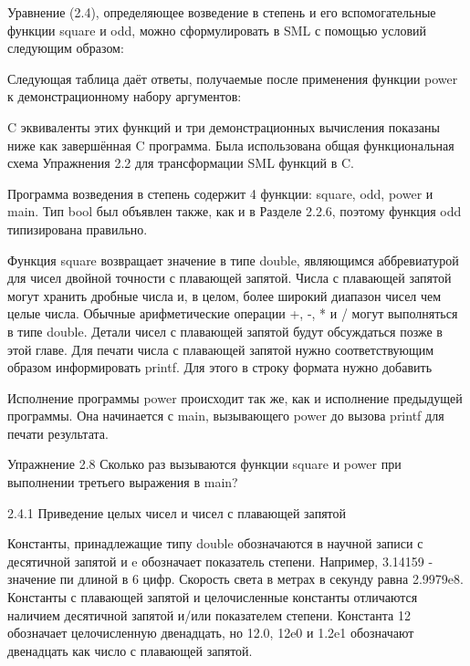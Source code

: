 Уравнение (2.4), определяющее возведение в степень и его вспомогательные функции square и odd, можно сформулировать в SML с помощью условий следующим образом:

Следующая таблица даёт ответы, получаемые после применения функции power к демонстрационному набору аргументов:

C эквиваленты этих функций и три демонстрационных вычисления показаны ниже как завершённая C программа. Была использована общая функциональная схема Упражнения 2.2 для трансформации SML функций в C.

Программа возведения в степень содержит 4 функции: square, odd, power и main. Тип bool был объявлен также, как и в Разделе 2.2.6, поэтому функция odd типизирована правильно.

Функция square возвращает значение в типе double, являющимся аббревиатурой для чисел двойной точности с плавающей запятой. Числа с плавающей запятой могут хранить дробные числа и, в целом, более широкий диапазон чисел чем целые числа. Обычные арифметические операции +, -, * и / могут выполняться в типе double. Детали чисел с плавающей запятой будут обсуждаться позже в этой главе. Для печати числа с плавающей запятой нужно соответствующим образом информировать printf. Для этого в строку формата нужно добавить %

Исполнение программы power происходит так же, как и исполнение предыдущей программы. Она начинается с main, вызывающего power до вызова printf для печати результата.

Упражнение 2.8 Сколько раз вызываются функции square и power при выполнении третьего выражения в main?

2.4.1 Приведение целых чисел и чисел с плавающей запятой

Константы, принадлежащие типу double обозначаются в научной записи с десятичной запятой и e обозначает показатель степени. Например, 3.14159 - значение пи длиной в 6 цифр. Скорость света в метрах в секунду равна 2.9979e8. Константы с плавающей запятой и целочисленные константы отличаются наличием десятичной запятой и/или показателем степени. Константа 12 обозначает целочисленную двенадцать, но 12.0, 12e0 и 1.2e1 обозначают двенадцать как число с плавающей запятой.


